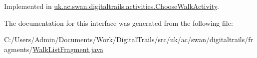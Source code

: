 Implemented in \hyperlink{classuk_1_1ac_1_1swan_1_1digitaltrails_1_1activities_1_1_choose_walk_activity_a39ce270e37176e416954386fdd7ed814}{uk.\+ac.\+swan.\+digitaltrails.\+activities.\+Choose\+Walk\+Activity}.



The documentation for this interface was generated from the following file\+:\begin{DoxyCompactItemize}
\item 
C\+:/\+Users/\+Admin/\+Documents/\+Work/\+Digital\+Trails/src/uk/ac/swan/digitaltrails/fragments/\hyperlink{_walk_list_fragment_8java}{Walk\+List\+Fragment.\+java}\end{DoxyCompactItemize}
